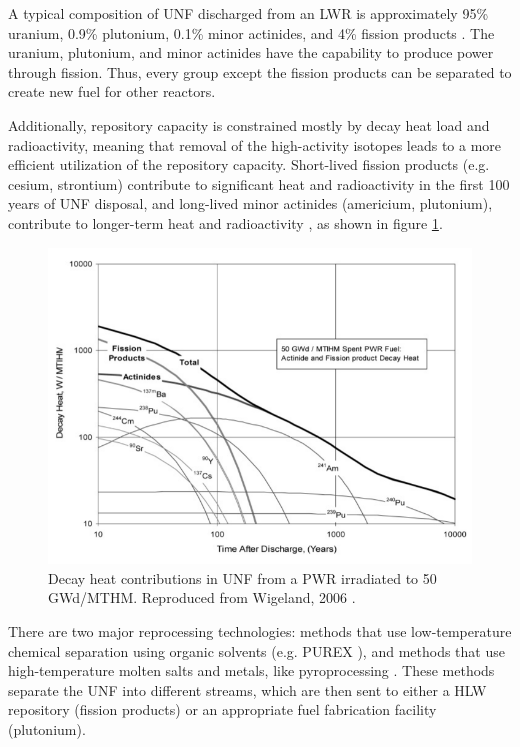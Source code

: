 A typical composition of \gls{UNF} discharged from an \gls{LWR}
is approximately 95\% uranium, 0.9\% plutonium, 0.1\%
minor actinides, and 4\% fission products \cite{feiveson_spent_2011}.
The uranium, plutonium, and minor actinides have the capability
to produce power through fission. Thus, every group except the
fission products can be separated to create new fuel for other reactors.

Additionally, repository capacity is constrained mostly by decay heat
load and radioactivity, meaning that removal of the high-activity
isotopes leads to a more efficient utilization of the repository
capacity. Short-lived fission products (e.g. cesium, strontium) contribute
to significant heat and radioactivity in the first 100 years of \gls{UNF} disposal,
and long-lived minor actinides (americium, plutonium),
contribute to longer-term heat and radioactivity \cite{wigeland_separations_2006},
as shown in figure \ref{fig:decay_heat}.

\begin{figure}[htbp!]
	\begin{center}
		\hspace*{-1.5cm}
		\includegraphics[scale=0.6]{./images/decay_heat.png}
	\end{center}
	\caption{Decay heat contributions in \gls{UNF} from a \gls{PWR} irradiated
		to 50 GWd/MTHM. Reproduced from Wigeland, 2006 \cite{wigeland_separations_2006}.}
	\label{fig:decay_heat}
\end{figure}


There are two major reprocessing technologies:
methods that use low-temperature chemical separation
using organic solvents (e.g. PUREX \cite{baumgaertner_purex_1976}), and
methods that use high-temperature molten salts and metals, like pyroprocessing
\cite{laidler_development_1997}. These methods separate the \gls{UNF}
into different streams, which are then sent to either a \gls{HLW} repository
(fission products) or an appropriate fuel fabrication facility (plutonium).

